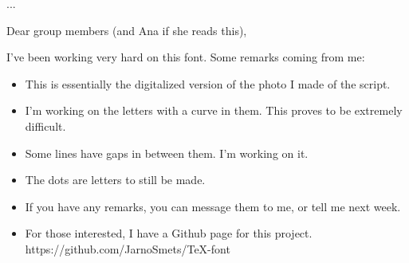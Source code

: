 \documentclass{article}
\begin{document}
\DeclareLetter{\CenterUpperVertical}{\BigHypoUpperRight}
\DeclareLetter{\CenterVertical}{\HypoUpperRight}
\DeclareLetter{\CenterVertical}{\LeftBigHypoUpperRight}
\DeclareLetter{\CenterBottomVertical}{\LeftBigHypoBottomRight}
\DeclareLetter{\CenterBottomVertical}{\BigHypoBottomRight}
\DeclareLetter{\CenterBottomVertical}{\LeftBigHypoBottomRight}
\DeclareLetter{\CenterVertical}{\LeftBigHypoUpperRight}
\DeclareLetter{\CenterVertical}{\LeftHypoHeaven}
\DeclareLetter{\CenterVertical}{\BigHypoCenterRight}
\DeclareLetter{\CenterVertical}{\BigHypoCenterRight}

\DeclareLetter{\CenterBottomVertical}{\BigCurveUpperRight}




...

\DeclareLetter{\BigHypoUpperLeft}{\LeftCenterUpperDiagonal}
\DeclareLetter{\LeftBigHypoUpperLeft}{\LeftCenterUpperDiagonal}


\dotfill

\vspace{2cm}

Dear group members (and Ana if she reads this),


I've been working very hard on this font. Some remarks coming from me:
\begin{itemize}
	\item This is essentially the digitalized version of the photo I made of the script. 
	\item I'm working on the letters with a curve in them. This proves to be extremely difficult. 
	\item Some lines have gaps in between them. I'm working on it. 
	\item The dots are letters to still be made. 
	\item If you have any remarks, you can message them to me, or tell me next week.
	\item For those interested, I have a Github page for this project. https://github.com/JarnoSmets/TeX-font 
\end{itemize}
\end{document}
